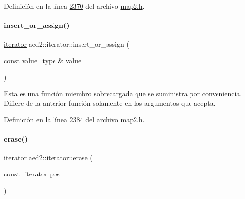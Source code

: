 Definición en la línea \hyperlink{map2_8h_source_l02370}{2370} del archivo \hyperlink{map2_8h_source}{map2.\+h}.

\mbox{\label{classaed2_1_1iterator_af131c4b0d89978372a0c8ce38bf8f33e_af131c4b0d89978372a0c8ce38bf8f33e}} 
\paragraph{\texorpdfstring{insert\+\_\+or\+\_\+assign()}{insert\_or\_assign()}\hspace{0.1cm}{\footnotesize\ttfamily [2/2]}}
{\footnotesize\ttfamily \hyperlink{classaed2_1_1iterator_1_1iterator}{iterator} aed2\+::iterator\+::insert\+\_\+or\+\_\+assign (\begin{DoxyParamCaption}\item[{const \hyperlink{classaed2_1_1iterator_a6411a2c08b2b7c52f063bef1a168acb6_a6411a2c08b2b7c52f063bef1a168acb6}{value\+\_\+type} \&}]{value }\end{DoxyParamCaption})\hspace{0.3cm}{\ttfamily [inline]}}

Esta es una función miembro sobrecargada que se suministra por conveniencia. Difiere de la anterior función solamente en los argumentos que acepta. 

Definición en la línea \hyperlink{map2_8h_source_l02384}{2384} del archivo \hyperlink{map2_8h_source}{map2.\+h}.

\mbox{\label{classaed2_1_1iterator_adf371aaec9e68bd4a4d5a889d0b6b679_adf371aaec9e68bd4a4d5a889d0b6b679}} 
\paragraph{\texorpdfstring{erase()}{erase()}\hspace{0.1cm}{\footnotesize\ttfamily [1/2]}}
{\footnotesize\ttfamily \hyperlink{classaed2_1_1iterator_1_1iterator}{iterator} aed2\+::iterator\+::erase (\begin{DoxyParamCaption}\item[{\hyperlink{classaed2_1_1iterator_1_1const__iterator}{const\+\_\+iterator}}]{pos }\end{DoxyParamCaption})\hspace{0.3cm}{\ttfamily [inline]}}



